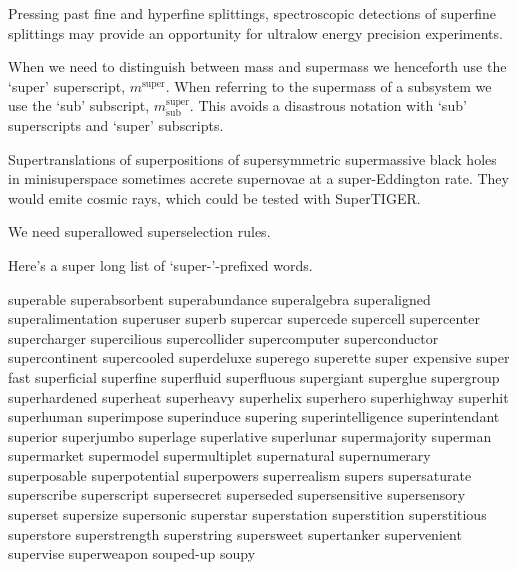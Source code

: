 Pressing past fine and hyperfine splittings, spectroscopic detections of superfine splittings may provide an opportunity for ultralow energy precision experiments.

When we need to distinguish between mass and supermass we henceforth use the `super' superscript, $m^{\text{super}}$.  When referring to the supermass of a subsystem we use the `sub' subscript, $m^{\text{super}}_{\text{sub}}$.  This avoids a disastrous notation with `sub' superscripts and `super' subscripts.

Supertranslations of superpositions of supersymmetric supermassive black holes in minisuperspace sometimes accrete supernovae at a super-Eddington rate.
They would emite cosmic rays, which could be tested with SuperTIGER.

We need superallowed superselection rules.

Here's a super long list of `super-'-prefixed words.

superable
superabsorbent
superabundance
superalgebra
superaligned
superalimentation
superuser
superb
supercar
supercede
supercell
supercenter
supercharger
supercilious
supercollider
supercomputer
superconductor
supercontinent
supercooled
superdeluxe
superego
superette
super expensive
super fast
superficial
superfine
superfluid
superfluous
supergiant
superglue
supergroup
superhardened
superheat
superheavy
superhelix
superhero
superhighway
superhit
superhuman
superimpose
superinduce
supering
superintelligence
superintendant
superior
superjumbo
superlage
superlative
superlunar
supermajority
superman
supermarket
supermodel
supermultiplet
supernatural
supernumerary
superposable
superpotential
superpowers
superrealism
supers
supersaturate
superscribe
superscript
supersecret
superseded
supersensitive
supersensory
superset
supersize
supersonic
superstar
superstation
superstition
superstitious
superstore
superstrength
superstring
supersweet
supertanker
supervenient
supervise
superweapon
souped-up
soupy
